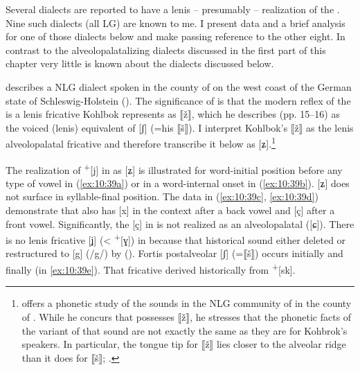 \begin{xlist}
Several dialects are reported to have a lenis -- presumably  -- realization of the . Nine such dialects (all LG) are known to me. I present data and a brief analysis for one of those dialects below and make passing reference to the other eight. In contrast to the alveolopalatalizing dialects discussed in the first part of this chapter very little is known about the dialects discussed below.

\citet{Kohbrok1901} describes a NLG dialect spoken in the county of  on the west coast of the German state of Schleswig-Holstein (). The significance of  is that the modern reflex of the  is a lenis fricative Kohlbok represents as ⟦ž⟧, which he describes (pp. 15--16) as the voiced (lenis) equivalent of [ʃ] (=his ⟦š⟧). I interpret Kohlbok’s ⟦ž⟧ as the lenis alveolopalatal fricative and therefore transcribe it below as [ʑ].\footnote{\citet{Stammerjohann1914} offers a phonetic study of the sounds in the NLG community of  in the county of . While he concurs that  possesses ⟦ž⟧, he stresses that the phonetic facts of the  variant of that sound are not exactly the same as they are for Kohbrok’s speakers. In particular, the tongue tip for ⟦ž⟧ lies closer to the alveolar ridge than it does for ⟦š⟧; \citet[67]{Stammerjohann1914}.}

The realization of  \textsuperscript{+}[j] in  as [ʑ] is illustrated for word-initial position before any type of vowel in (\ref{ex:10:39a}) or in a word-internal onset in (\ref{ex:10:39b}). [ʑ] does not surface in syllable-final position. The data in (\ref{ex:10:39c}, \ref{ex:10:39d}) demonstrate that  also has [x] in the context after a back vowel and [ç] after a front vowel. Significantly, the [ç] in  is not realized as an alveolopalatal ([ɕ]). There is no lenis fricative [ʝ] (< \textsuperscript{+}[ɣ]) in  because that historical sound either deleted or restructured to [g] (/g/) by  (). Fortis postalveolar [ʃ] (=⟦š⟧) occurs initially and finally (in \ref{ex:10:39e}). That fricative derived historically from  \textsuperscript{+}[sk].\largerpage[-1]\pagebreak


\end{xlist}
